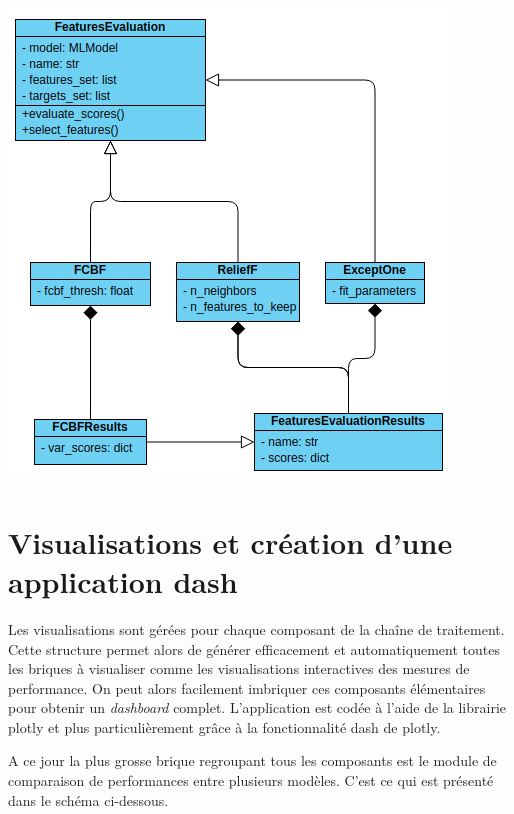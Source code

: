 \begin{center}
\includegraphics[scale=0.55]{figures/diagramme_classe_select.png}
\label{fig14}
\end{center}

\section{Visualisations et création d’une application dash}

Les visualisations sont gérées pour chaque composant de la chaîne de traitement. Cette structure permet alors de générer efficacement et automatiquement toutes les briques à visualiser comme les visualisations interactives des mesures de performance. On peut alors facilement imbriquer ces composants élémentaires pour obtenir un \textit{dashboard} complet. L’application est codée à l’aide de la librairie plotly et plus particulièrement grâce à la fonctionnalité dash de plotly.

A ce jour la plus grosse brique regroupant tous les composants est le module de comparaison de performances entre plusieurs modèles. C’est ce qui est présenté dans le schéma ci-dessous.

